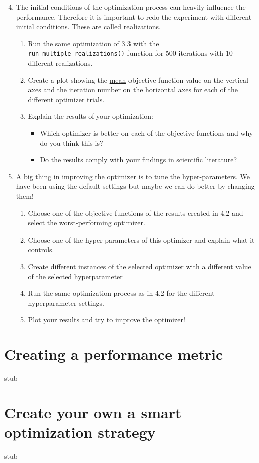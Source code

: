 \documentclass[10pt,a4paper,twoside]{article} %
\def\code#1{\texttt{#1}}
\begin{document}
\begin{enumerate}
	\setcounter{enumi}{3}
	\item The initial conditions of the optimization process can heavily influence the performance. Therefore it is important to redo the experiment with different initial conditions. These are called realizations.
	
	\begin{enumerate} [label*=\arabic*.]
		\item Run the same optimization of 3.3 with the \code{run\_multiple\_realizations()} function for 500 iterations with 10 different realizations.
		
		\item Create a plot showing the \underline{mean} objective function value on the vertical axes and the iteration number on the horizontal axes for each of the different optimizer trials.
		
		\item Explain the results of your optimization:
		\begin{itemize}
			\item Which optimizer is better on each of the objective functions and why do you think this is?
			\item Do the results comply with your findings in scientific literature?
		
		\end{itemize}
	\end{enumerate}
\end{enumerate}

\begin{enumerate}
	\setcounter{enumi}{4}
	\item A big thing in improving the optimizer is to tune the hyper-parameters. We have been using the default settings but maybe we can do better by changing them!
	
	\begin{enumerate} [label*=\arabic*.]
		\item Choose one of the objective functions of the results created in 4.2 and select the worst-performing optimizer.
		\item Choose one of the hyper-parameters of this optimizer and explain what it controls.
		\item Create different instances of the selected optimizer with a different value of the selected hyperparameter
		\item Run the same optimization process as in 4.2 for the different hyperparameter settings.
		\item Plot your results and try to improve the optimizer! 
	\end{enumerate}
\end{enumerate}


\section*{Creating a performance metric}

stub

\section*{Create your own a smart optimization strategy}

stub

{\small
	
	
}
\end{document}
